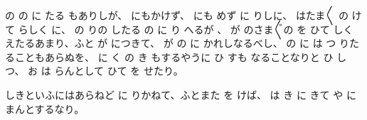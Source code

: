 の
の
に
たる
もありしが、
にもかけず、
にも
めず
に
りしに、
はたま〳〵
の
けて
らしく
に、
の
りの
したる
の
に
り
へるが
、
が
のさま〴〵の
を
ひて
しく
えたるあまり、ふと
が
につきて、
が
の
に
かれしなるべし、
の
に
は
つ
りたることもあらぬを、
に
く
の
き
もするやうに
ひ
すも
なることなりと
ひ
しつ、
お
は
らんとして
ひて
を
せたり。

しきといふにはあらねど
に
りかねて、ふとまた
を
けば、
は
き
に
きて
や
に
まんとするなり。

